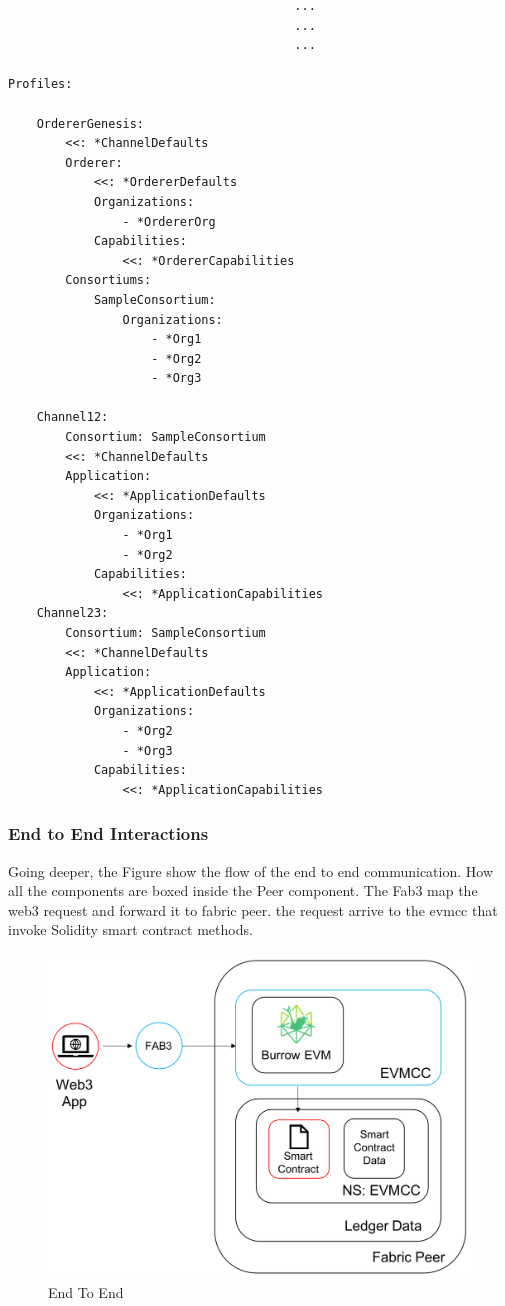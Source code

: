 {\begin{lstlisting}
                                        ...
                                        ...
                                        ...

Profiles:

    OrdererGenesis:
        <<: *ChannelDefaults
        Orderer:
            <<: *OrdererDefaults
            Organizations:
                - *OrdererOrg
            Capabilities:
                <<: *OrdererCapabilities
        Consortiums:
            SampleConsortium:
                Organizations:
                    - *Org1
                    - *Org2
                    - *Org3

    Channel12:
        Consortium: SampleConsortium
        <<: *ChannelDefaults
        Application:
            <<: *ApplicationDefaults
            Organizations:
                - *Org1
                - *Org2
            Capabilities:
                <<: *ApplicationCapabilities
    Channel23:
        Consortium: SampleConsortium
        <<: *ChannelDefaults
        Application:
            <<: *ApplicationDefaults
            Organizations:
                - *Org2
                - *Org3
            Capabilities:
                <<: *ApplicationCapabilities    
\end{lstlisting}

    \subsubsection{End to End Interactions} 
    Going deeper, the Figure show the flow of the end to end communication. How all the components are boxed 
    inside the Peer component. The Fab3 map the web3 request and forward it to fabric peer. the request 
    arrive to the evmcc that invoke Solidity smart contract methods.

    \begin{figure}[h!]
        \centering
        \includegraphics[totalheight=7.5cm]{img/EndToEnd.png}
        \caption{End To End}
        \label{fig:end_to_end}
    \end{figure}

}
